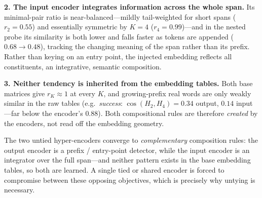 \textbf{2. The input encoder integrates information across the whole span.}
  Its minimal-pair ratio is near-balanced---mildly tail-weighted for short spans
  ($r_2{=}0.55$) and essentially symmetric by $K{=}4$ ($r_4{=}0.99$)---and in the
  nested probe its similarity is both lower and falls faster as tokens are
  appended ($0.68\!\to\!0.48$), tracking the changing meaning of the span rather
  than its prefix. Rather than keying on an entry point, the injected embedding
  reflects all constituents, an integrative, semantic composition.

\textbf{3. Neither tendency is inherited from the embedding tables.}
  Both base matrices give $r_K\!\approx\!1$ at every $K$, and growing-prefix real
  words are only weakly similar in the raw tables (e.g.\ \textit{success}:
  $\cos(H_2,H_4){=}0.34$ output, $0.14$ input---far below the encoder's $0.88$). Both compositional rules are
  therefore \emph{created} by the encoders, not read off the embedding geometry.

\begin{takeaway}
The two untied hyper-encoders converge to \emph{complementary} composition rules:
the output encoder is a prefix / entry-point detector, while the input encoder is
an integrator over the full span---and neither pattern exists in the base
embedding tables, so both are learned. A single tied or shared encoder is forced
to compromise between these opposing objectives, which is precisely why untying
is necessary.
\end{takeaway}